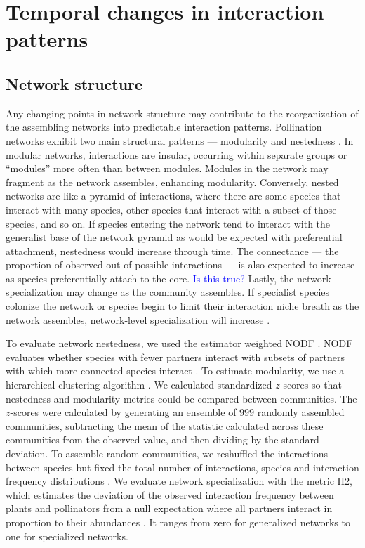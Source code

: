 \documentclass[12pt]{article}
\newcommand{\flagged}[1] {
  \textcolor{blue}{#1}
}
\begin{document}
\section*{Temporal changes in interaction patterns}

\subsection*{Network structure}
Any changing points in network structure may contribute to the
reorganization of the assembling networks into predictable interaction
patterns. Pollination networks exhibit two main structural patterns
--- modularity \citep[e.g.,][]{Olesen2007} and nestedness
\citep[e.g.,][]{Bascompte2006, Bascompte2003}. In modular networks,
interactions are insular, occurring within separate groups or
``modules'' more often than between modules. Modules in the network
may fragment as the network assembles, enhancing
modularity. Conversely, nested networks are like a pyramid of
interactions, where there are some species that interact with many
species, other species that interact with a subset of those species,
and so on. If species entering the network tend to interact with the
generalist base of the network pyramid as would be expected with
preferential attachment, nestedness would increase through time. The
connectance --- the proportion of observed out of possible
interactions --- is also expected to increase as species
preferentially attach to the core. \flagged{Is this true?} Lastly, the
network specialization may change as the community assembles. If
specialist species colonize the network or species begin to limit
their interaction niche breath as the network assembles, network-level
specialization will increase \citep{bluthgen-2006-9}.

To evaluate network nestedness, we used the estimator weighted NODF
\citep{nodf}. NODF evaluates whether species with fewer partners
interact with subsets of partners with which more connected species
interact \citep{nodf}. To estimate modularity, we use a hierarchical
clustering algorithm \citep{Newman2004, igraph}.  We calculated
standardized $z$-scores so that nestedness and modularity metrics
could be compared between communities. The $z$-scores were calculated
by generating an ensemble of $999$ randomly assembled communities,
subtracting the mean of the statistic calculated across these
communities from the observed value, and then dividing by the standard
deviation. To assemble random communities, we reshuffled the
interactions between species but fixed the total number of
interactions, species and interaction frequency distributions
\citep{Galeano2009}. We evaluate network specialization with the
metric H2, which estimates the deviation of the observed interaction
frequency between plants and pollinators from a null expectation where
all partners interact in proportion to their abundances
\citep{bluthgen-2006-9}. It ranges from zero for generalized networks
to one for specialized networks.
\end{document}
